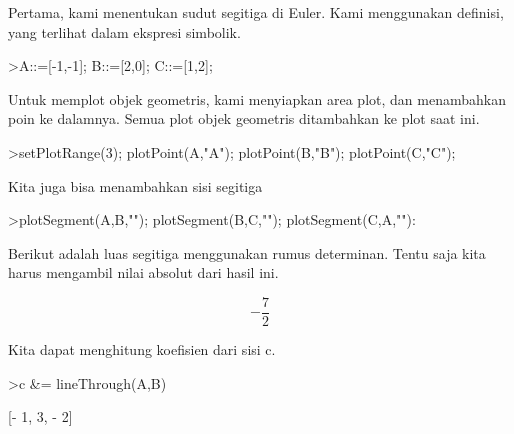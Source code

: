 \documentclass[12pt,arial,letterpaper]{book}
\begin{document}
\begin{eulernootebook}
\begin{eulercomment}
\begin{eulercomment}
\begin{eulernootebook}
\begin{eulercomment}
\begin{eulercomment}
\begin{eulercomment}
\begin{eulercomment}
\begin{eulercomment}
\begin{eulercomment}
\begin{eulernotebook}
\begin{eulercomment}
\begin{eulercomment}
\begin{eulercomment}
Pertama, kami menentukan sudut segitiga di Euler. Kami menggunakan
definisi, yang terlihat dalam ekspresi simbolik.
\end{eulercomment}
\begin{eulerprompt}
>A::=[-1,-1]; B::=[2,0]; C::=[1,2];
\end{eulerprompt}
\begin{eulercomment}
Untuk memplot objek geometris, kami menyiapkan area plot, dan
menambahkan poin ke dalamnya. Semua plot objek geometris ditambahkan
ke plot saat ini.
\end{eulercomment}
\begin{eulerprompt}
>setPlotRange(3); plotPoint(A,"A"); plotPoint(B,"B"); plotPoint(C,"C");
\end{eulerprompt}
\begin{eulercomment}
Kita juga bisa menambahkan sisi segitiga
\end{eulercomment}
\begin{eulerprompt}
>plotSegment(A,B,""); plotSegment(B,C,""); plotSegment(C,A,""):
\end{eulerprompt}
\begin{eulercomment}
Berikut adalah luas segitiga menggunakan rumus determinan. Tentu saja
kita harus mengambil nilai absolut dari hasil ini.
\end{eulercomment}
\begin{eulerformula}
\[
-\frac{7}{2}
\]
\end{eulerformula}
\begin{eulercomment}
Kita dapat menghitung koefisien dari sisi c.
\end{eulercomment}
\begin{eulerprompt}
>c &= lineThrough(A,B)
\end{eulerprompt}
\begin{euleroutput}
  
                              [- 1, 3, - 2]
  

\end{euleroutput}
\end{eulercomment}
\end{eulercomment}
\end{eulernotebook}
\end{eulercomment}
\end{eulercomment}
\end{eulercomment}
\end{eulercomment}
\end{eulercomment}
\end{eulercomment}
\end{eulernootebook}
\end{eulercomment}
\end{eulercomment}
\end{eulernootebook}
\end{document}
